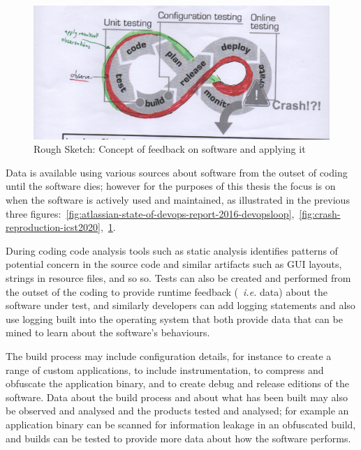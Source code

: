 \begin{figure}
    \includegraphics[width=\linewidth]{images/rough-sketches/hack-of-devops-crash-figure.pdf}
    \caption[Concept of feedback on software and applying it]{Rough Sketch: Concept of feedback on software and applying it}
    \label{fig:oberve-and-apply-devops-loop}
\end{figure}

Data is available using various sources about software from the outset of coding until the software dies; however for the purposes of this thesis the focus is on when the software is actively used and maintained, as illustrated in the previous three figures:~\ref{fig:atlassian-state-of-devops-report-2016-devopsloop},~\ref{fig:crash-reproduction-icst2020},~\ref{fig:oberve-and-apply-devops-loop}. 

During coding code analysis tools such as static analysis identifies patterns of potential concern in the source code and similar artifacts such as GUI layouts, strings in resource files, and so so. Tests can also be created and performed from the outset of the coding to provide runtime feedback (~\emph{i.e.} data) about the software under test, and similarly developers can add logging statements and also use logging built into the operating system that both provide data that can be mined to learn about the software's behaviours.

The build process may include configuration details, for instance to create a range of custom applications, to include instrumentation, to compress and obfuscate the application binary, and to create debug and release editions of the software. Data about the build process and about what has been built may also be observed and analysed and the products tested and analysed; for example an application binary can be scanned for information leakage in an obfuscated build, and builds can be tested to provide more data about how the software performs.

